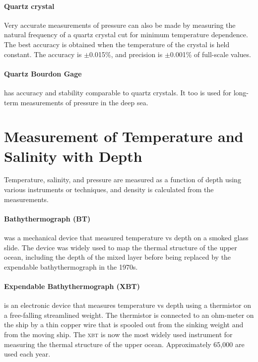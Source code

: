 \paragraph{Quartz crystal} Very accurate measurements of pressure can also
be made by measuring the
natural frequency of a quartz crystal cut for minimum temperature
dependence. The best accuracy is obtained
when the temperature of the crystal is held constant. The accuracy is
$\pm$0.015\%, and precision is $\pm$0.001\% of full-scale values.

\paragraph{Quartz Bourdon Gage} has accuracy
and stability comparable to quartz crystals. It too is used for long-term
measurements of pressure in the deep sea.

\section[Temperature and Salinity With Depth]{Measurement of Temperature and
Salinity with Depth}  Temperature, salinity,
and pressure are measured as a function of depth using various
instruments or techniques, and density is calculated from the
measurements.

\paragraph{Bathythermograph (BT)} was a mechanical device that measured
temperature vs depth on a smoked glass
slide. The device was widely used to map the thermal structure of the
upper ocean, including the depth of the mixed layer before being replaced by the
expendable bathythermograph in the 1970s.

\paragraph{Expendable Bathythermograph (XBT)} is an electronic device that
measures temperature vs depth using a thermistor on a
free-falling streamlined weight. The thermistor is connected to an
ohm-meter on the ship by a thin copper wire that is spooled out from
the sinking weight and from the moving ship. The \textsc{xbt} is now
the most widely used instrument for measuring the thermal structure of
the upper ocean. Approximately 65,000 are used each year.

